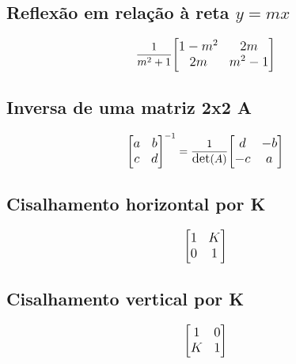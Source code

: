 \subsection{Reflexão em relação à reta $y = mx$ }
\begin{equation*}
\large{\frac{1}{m^2+1}}
\large{
\begin{bmatrix}
    1 - m^2 & 2m \\
    2m & m^2 - 1
\end{bmatrix}
}  
\end{equation*} 

\subsection{Inversa de uma matriz 2x2 A}
\begin{equation*} 
\large{
\begin{bmatrix}
    a & b \\
    c & d
\end{bmatrix}^{-1} =
\large{\frac{1}{\text{det}(A)}}
\large{
\begin{bmatrix}
    d & -b \\
    -c & a
\end{bmatrix}
}
}
\end{equation*}

\subsection{Cisalhamento horizontal por K}
\begin{equation*} 
\large{
\begin{bmatrix}
    1 & K \\
    0 & 1
\end{bmatrix}
}
\end{equation*}

\subsection{Cisalhamento vertical por K}
\begin{equation*} 
\large{
\begin{bmatrix}
    1 & 0 \\
    K & 1
\end{bmatrix}
}
\end{equation*}

